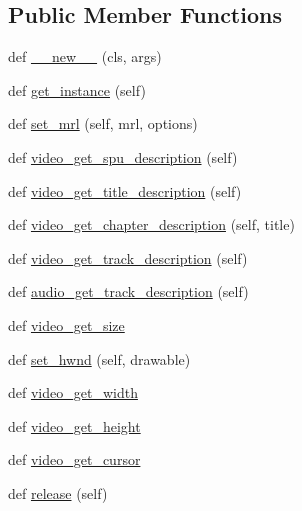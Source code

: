 \subsection*{Public Member Functions}
\begin{DoxyCompactItemize}
\item 
def \hyperlink{classsrc_1_1lib_1_1vlc_1_1MediaPlayer_ac13f8b11bd1dbb0779d79a8e5b6f7213}{\+\_\+\+\_\+new\+\_\+\+\_\+} (cls, args)
\item 
def \hyperlink{classsrc_1_1lib_1_1vlc_1_1MediaPlayer_a264eda1ac9755ec3628a1aa2c0380278}{get\+\_\+instance} (self)
\item 
def \hyperlink{classsrc_1_1lib_1_1vlc_1_1MediaPlayer_a94ebfbaa9c96105656c8353a507e85ac}{set\+\_\+mrl} (self, mrl, options)
\item 
def \hyperlink{classsrc_1_1lib_1_1vlc_1_1MediaPlayer_afc33dc5b48f9455259acd856d47578f5}{video\+\_\+get\+\_\+spu\+\_\+description} (self)
\item 
def \hyperlink{classsrc_1_1lib_1_1vlc_1_1MediaPlayer_a6405c62a60af867bc5d13f4cc40876d2}{video\+\_\+get\+\_\+title\+\_\+description} (self)
\item 
def \hyperlink{classsrc_1_1lib_1_1vlc_1_1MediaPlayer_aafc25cfcae05b82c8558ad14724f727f}{video\+\_\+get\+\_\+chapter\+\_\+description} (self, title)
\item 
def \hyperlink{classsrc_1_1lib_1_1vlc_1_1MediaPlayer_a9550de3d65aac8f7f2c122ee6046eba2}{video\+\_\+get\+\_\+track\+\_\+description} (self)
\item 
def \hyperlink{classsrc_1_1lib_1_1vlc_1_1MediaPlayer_a1f368380024537d51f095f265f5f8dea}{audio\+\_\+get\+\_\+track\+\_\+description} (self)
\item 
def \hyperlink{classsrc_1_1lib_1_1vlc_1_1MediaPlayer_af3f0fc8cb2d9dd363c9953759570f39f}{video\+\_\+get\+\_\+size}
\item 
def \hyperlink{classsrc_1_1lib_1_1vlc_1_1MediaPlayer_a11f19ca6cdd8581c4b270327ff171a75}{set\+\_\+hwnd} (self, drawable)
\item 
def \hyperlink{classsrc_1_1lib_1_1vlc_1_1MediaPlayer_a7f2dcd26949bd60b59b52525f203f5dc}{video\+\_\+get\+\_\+width}
\item 
def \hyperlink{classsrc_1_1lib_1_1vlc_1_1MediaPlayer_ab57308d53debfea51273f7a8d2650f37}{video\+\_\+get\+\_\+height}
\item 
def \hyperlink{classsrc_1_1lib_1_1vlc_1_1MediaPlayer_a566fb82157c233b0e0b00f3cd54386b1}{video\+\_\+get\+\_\+cursor}
\item 
def \hyperlink{classsrc_1_1lib_1_1vlc_1_1MediaPlayer_aa1a2f85b506a01492eecfa3655211d89}{release} (self)

\end{DoxyCompactItemize}
